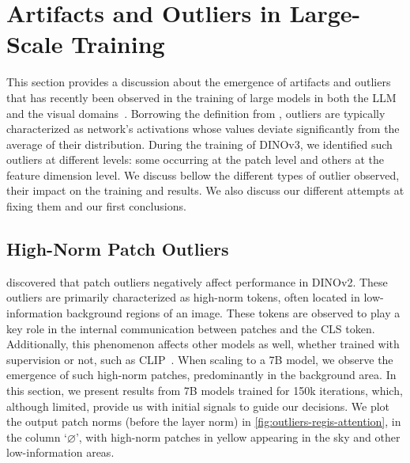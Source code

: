 

\section{Artifacts and Outliers in Large-Scale Training}
\label{app:sec:artifacts}

This section provides a discussion about the emergence of artifacts and outliers that has recently been observed in the training of large models in both the LLM~\citep{an2025systematic} and the visual domains~\citep{darcet2024vision}. 
Borrowing the definition from \citet{an2025systematic}, outliers are typically characterized as network's activations whose values deviate significantly from the average of their distribution. %
During the training of DINOv3, we identified such outliers at different levels: some occurring at the patch level and others at the feature dimension level. 
We discuss bellow the different types of outlier observed, their impact on the training and results. 
We also discuss our different attempts at fixing them and our first conclusions. 

\subsection{High-Norm Patch Outliers}
 
\citet{darcet2024vision} discovered that patch outliers negatively affect performance in DINOv2. 
These outliers are primarily characterized as high-norm tokens, often located in low-information background regions of an image. 
These tokens are observed to play a key role in the internal communication between patches and the CLS token. 
Additionally, this phenomenon affects other models as well, whether trained with supervision or not, such as CLIP~\citep{radford2021learning}.
When scaling to a 7B model, we observe the emergence of such high-norm patches, predominantly in the background area. In this section, we present results from 7B models trained for 150k iterations, which, although limited, provide us with initial signals to guide our decisions.
We plot the output patch norms (before the layer norm) in \cref{fig:outliers-regis-attention}, in the column `$\varnothing$', with high-norm patches in yellow appearing in the sky and other low-information areas.

